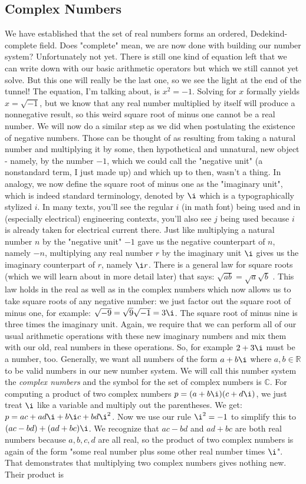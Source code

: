 \subsection{Complex Numbers}
We have established that the set of real numbers forms an ordered, Dedekind-complete field. Does "complete" mean, we are now done with building our number system? Unfortunately not yet. There is still one kind of equation left that we can write down with our basic arithmetic operators but which we still cannot yet solve. But this one will really be the last one, so we see the light at the end of the tunnel! The equation, I'm talking about, is $x^2 = -1$. Solving for $x$ formally yields $x = \sqrt{-1}$, but we know that any real number multiplied by itself will produce a nonnegative result, so this weird square root of minus one cannot be a real number. We will now do a similar step as we did when postulating the existence of negative numbers. Those can be thought of as resulting from taking a natural number and multiplying it by some, then hypothetical and unnatural, new object - namely, by the number $-1$, which we could call the "negative unit" (a nonstandard term, I just made up) and which up to then, wasn't a thing. In analogy, we now define the square root of minus one as the "imaginary unit", which is indeed standard terminology, denoted by $\i$ which is a typographically stylized $i$. In many texts, you'll see the regular $i$ (in math font) being used and in (especially electrical) engineering contexts, you'll also see $j$ being used because $i$ is already taken for electrical current there. Just like multiplying a natural number $n$ by the "negative unit" $-1$ gave us the negative counterpart of $n$, namely $-n$, multiplying any real number $r$ by the imaginary unit $\i$ gives us the imaginary counterpart of $r$, namely $\i r$. There is a general law for square roots (which we will learn about in more detail later) that says: $\sqrt{a b} = \sqrt{a} \sqrt{b}$ . This law holds in the real as well as in the complex numbers which now allows us to take square roots of any negative number: we just factor out the square root of minus one, for example: $\sqrt{-9} = \sqrt{9} \sqrt{-1} = 3 \i$. The square root of minus nine is three times the imaginary unit. Again, we require that we can perform all of our usual arithmetic operations with these new imaginary numbers and mix them with our old, real numbers in these operations. So, for example $2 + 3 \i$ must be a number, too. Generally, we want all numbers of the form $a + b \i$ where $a,b \in \mathbb{R}$ to be valid numbers in our new number system. We will call this number system the \emph{complex numbers} and the symbol for the set of complex numbers is $\mathbb{C}$. For computing a product of two complex numbers $p = (a + b \i)(c + d \i)$, we just treat $\i$ like a variable and multiply out the parentheses. We get: $p = a c + a d \i + b \i c + b d \i^2$. Now we use our rule $\i^2 = -1$ to simplify this to $(ac - bd) + (a d + b c) \i$. We recognize that $ac - bd$ and $ad + bc$ are both real numbers because $a,b,c,d$ are all real, so the product of two complex numbers is again of the form "some real number plus some other real number times $\i$". That demonstrates that multiplying two complex numbers gives nothing new. Their product is 
